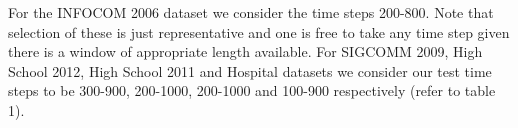 For the INFOCOM 2006 dataset we consider the time steps 200-800. 
Note that selection of these is just representative and one is free to take 
any time step given there is a window of appropriate length available. For SIGCOMM 2009, High School 2012, High School 2011 and Hospital datasets we 
consider our test time steps to be 300-900, 200-1000, 200-1000 and 100-900 respectively (refer to table 1). 

